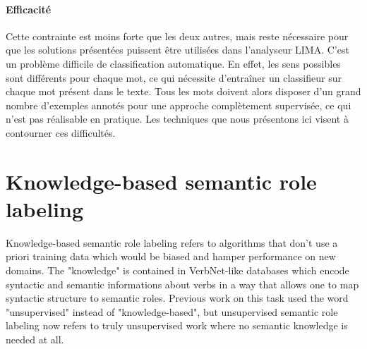 \paragraph{Efficacité} Cette contrainte est moins forte que les deux autres,
mais reste nécessaire pour que les solutions présentées puissent être
utilisées dans l'analyseur LIMA.  C'est un problème difficile de
classification automatique. En effet, les sens possibles sont différents pour
chaque mot, ce qui nécessite d'entraîner un classifieur sur chaque mot présent
dans le texte. Tous les mots doivent alors disposer d'un grand nombre
d'exemples annotés pour une approche complètement supervisée, ce qui n'est pas
réalisable en pratique. Les techniques que nous présentons ici visent à
contourner ces difficultés.

\section{Knowledge-based semantic role labeling}
\label{sec:srl}

Knowledge-based semantic role labeling refers to algorithms that don't use a
priori training data which would be biased and hamper performance on new
domains. The "knowledge" is contained in VerbNet-like databases which encode
syntactic and semantic informations about verbs in a way that allows one to map
syntactic structure to semantic roles. Previous work on this task used the word
"unsupervised" instead of "knowledge-based", but unsupervised semantic role
labeling now refers to truly unsupervised work where no semantic knowledge is
needed at all.
